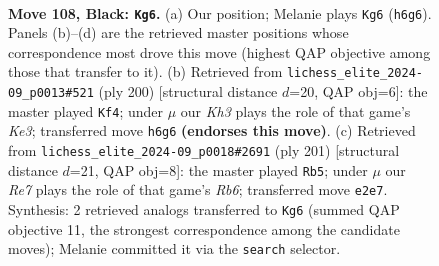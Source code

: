 \documentclass[11pt]{article}
\begin{document}
\clearpage

\begin{figure}[p]\centering
\begin{subfigure}{0.46\textwidth}\centering
\resizebox{\linewidth}{!}{%
\newchessgame
\chessboard[
  setfen={8/6p1/1N3p1k/5R1p/7P/6PK/4r3/8 b - - 41 108},
  showmover=false,
  pgfstyle=straightmove, color=movearrow, markmove={h6-g6}
]}
\caption{}
\end{subfigure}\hfill
\begin{subfigure}{0.46\textwidth}\centering
\resizebox{\linewidth}{!}{%
\newchessgame
\chessboard[
  setfen={8/2R5/6pk/7p/7P/1r2KPP1/8/8 w - - 11 101},
  showmover=false,
  pgfstyle=straightmove, color=movearrow, markmove={e3-f4}
]}
\caption{}
\end{subfigure}
\\[4pt]
\begin{subfigure}{0.46\textwidth}\centering
\resizebox{\linewidth}{!}{%
\newchessgame
\chessboard[
  setfen={8/8/2R3p1/5k1p/4p2P/1r4P1/5K2/8 b - - 65 101},
  showmover=false,
  pgfstyle=straightmove, color=movearrow, markmove={b3-b5}
]}
\caption{}
\end{subfigure}\hfill

\caption{\textbf{Move 108, Black: \texttt{Kg6}.} (a) Our position; Melanie plays \texttt{Kg6} (\texttt{h6g6}). Panels (b)--(d) are the retrieved master positions whose correspondence most drove this move (highest QAP objective among those that transfer to it). (b) Retrieved from \texttt{lichess\_elite\_2024-09\_p0013\#521} (ply 200) [structural distance $d$=20, QAP obj=6]: the master played \texttt{Kf4}; under $\mu$ our \emph{Kh3} plays the role of that game's \emph{Ke3}; transferred move \texttt{h6g6} \textbf{(endorses this move)}. (c) Retrieved from \texttt{lichess\_elite\_2024-09\_p0018\#2691} (ply 201) [structural distance $d$=21, QAP obj=8]: the master played \texttt{Rb5}; under $\mu$ our \emph{Re7} plays the role of that game's \emph{Rb6}; transferred move \texttt{e2e7}. Synthesis: 2 retrieved analogs transferred to \texttt{Kg6} (summed QAP objective 11, the strongest correspondence among the candidate moves); Melanie committed it via the \texttt{search} selector.}
\label{fig:thought-m215}
\end{figure}

\clearpage
\end{document}
